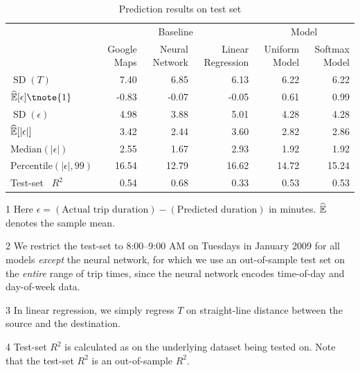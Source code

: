 \documentclass{article}
\newcommand{\sd}{\operatorname{SD}}
\begin{document}
\begin{table}
\centering
\begin{threeparttable}
\begin{tabular}{lrrrrr}
\toprule
& \multicolumn{3}{c}{Baseline} & \multicolumn{2}{c}{Model} \\\cmidrule(r){2-4} \cmidrule(l){5-6} 
{} & Google Maps & Neural Network\tnote{2} & Linear Regression\tnote{3} & Uniform Model & Softmax Model \\
\midrule
$\sd(T)$ & 7.40 & 6.85& 6.13&  6.22 & 6.22 \\ [1em]
$\hat \E[\epsilon]\tnote{1}$ & -0.83 &-0.07 & -0.05&  0.61 & 0.99 \\
$\sd(\epsilon)$ & 4.98 & 3.88& 5.01&  4.28 & 4.28 \\[1em]
$\widehat {\mathbb{E}}[|\epsilon|]$ & 3.42 & 2.44& 3.60&  2.82 & 2.86 \\
$\text{Median}(|\epsilon|)$ & 2.55 & 1.67& 2.93 &  1.92 & 1.92 \\
$\text{Percentile}(|\epsilon|, 99)$ & 16.54 &12.79 & 16.62&  14.72 & 15.24 \\ [1em]
Test-set\tnote{4}  \, $R^2$ & 0.54 & 0.68& 0.33 & 0.53 & 0.53 \\
\bottomrule
\end{tabular}
\caption{Prediction results on test set}
\label{tab:mainres}
\begin{tablenotes}
\item[1] Here $\epsilon = (\text{Actual trip duration}) - (\text{Predicted duration})$ in minutes. $\widehat {\mathbb{E}}$ denotes the sample mean. 
\item[2] We restrict the test-set to 8:00--9:00 AM on Tuesdays in January 2009 for all models \emph{except} the neural network, for which we use an out-of-sample test set on the \emph{entire} range of trip times, since the neural network encodes time-of-day and day-of-week data. 
\item[3]In linear regression, we simply regress $T$ on straight-line distance between the source and the destination.  
\item[4] Test-set $R^2$ is calculated as  on the underlying dataset being tested on. Note that the test-set $R^2$ is an out-of-sample $R^2$. 
\end{tablenotes}
\end{threeparttable}
\end{table}
\end{document}
